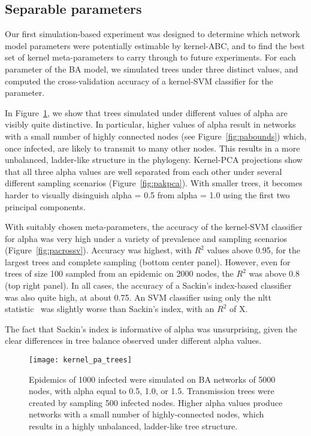 \subsection{Separable parameters}

Our first simulation-based experiment was designed to determine which network
model parameters were potentially estimable by kernel-ABC, and to find the best
set of kernel meta-parameters to carry through to future experiments. For each
parameter of the \gls{BA} model, we simulated trees under three distinct
values, and computed the cross-validation accuracy of a kernel-\gls{SVM}
classifier for the parameter.

In Figure~\ref{fig:patrees}, we show that trees simulated under different
values of \gls{alpha} are visibly quite distinctive. In particular, higher
values of \gls{alpha} result in networks with a small number of highly
connected nodes (see Figure~\ref{fig:pabounds}) which, once infected, are
likely to transmit to many other nodes. This results in a more unbalanced,
ladder-like structure in the phylogeny. Kernel-\gls{PCA} projections show that
all three \gls{alpha} values are well separated from each other under several
different sampling scenarios (Figure~\ref{fig:pakpca}). With smaller trees,
it becomes harder to visually disinguish \gls{alpha} = 0.5 from \gls{alpha} =
1.0 using the first two principal components.

With suitably chosen meta-parameters, the accuracy of the kernel-\gls{SVM}
classifier for \gls{alpha} was very high under a variety of prevalence and
sampling scenarios (Figure~\ref{fig:pacrossv}). Accuracy was highest, with
$R^2$ values above 0.95, for the largest trees and complete sampling (bottom
center panel). However, even for trees of size 100 sampled from an epidemic on
2000 nodes, the $R^2$ was above 0.8 (top right panel). In all cases, the
accuracy of a Sackin's index-based classifier was also quite high, at about
0.75. An \gls{SVM} classifier using only the \gls{nltt}
statistic~\autocite{janzen2015approximate} was slightly worse than Sackin's
index, with an $R^2$ of X.

The fact that Sackin's index is informative of \gls{alpha} was
unsurprising, given the clear differences in tree balance observed under
different \gls{alpha} values. 


\begin{figure}[ht]
  \centering
  \label{fig:patrees}
  \texttt{[image: kernel\_pa\_trees]}
  \caption[Visibly distinctive trees simulated under three values of \gls{alpha}]{
    Epidemics of 1000 infected were simulated on \gls{BA} networks of 5000
    nodes, with \gls{alpha} equal to 0.5, 1.0, or 1.5. Transmission trees were
    created by sampling 500 infected nodes. Higher \gls{alpha} values produce
    networks with a small number of highly-connected nodes, which results in a
    highly unbalanced, ladder-like tree structure.
  }
\end{figure}

